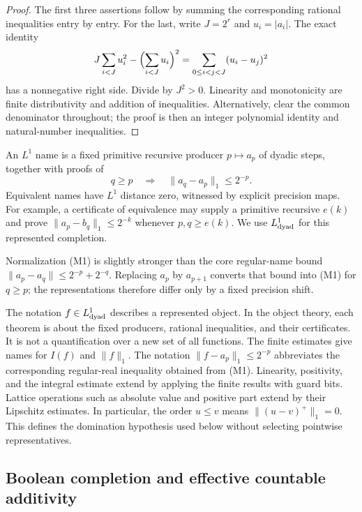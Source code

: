 \begin{proof}
The first three assertions follow by summing the corresponding rational
inequalities entry by entry.  For the last, write \(J=2^r\) and \(u_i=|a_i|\).
The exact identity
\[
 J\sum_{i<J}u_i^2-\Bigl(\sum_{i<J}u_i\Bigr)^2
   =\sum_{0\le i<j<J}(u_i-u_j)^2
\]
has a nonnegative right side.  Divide by \(J^2>0\).
Linearity and monotonicity are finite distributivity and addition of
inequalities.  Alternatively, clear the common denominator throughout; the
proof is then an integer polynomial identity and natural-number inequalities.
\end{proof}

\begin{definition}\label{m:l1}
An \(L^1\) name is a fixed primitive recursive producer \(p\mapsto a_p\) of
dyadic steps, together with proofs of
\[
 q\ge p\quad\Longrightarrow\quad \|a_q-a_p\|_1\le2^{-p}.
 \tag{M1}
\]
Equivalent names have \(L^1\) distance zero, witnessed by explicit precision
maps.  For example, a certificate of equivalence may supply a primitive
recursive \(e(k)\) and prove
\(\|a_p-b_q\|_1\le2^{-k}\) whenever \(p,q\ge e(k)\).
We use \(L^1_{\rm dyad}\) for this represented completion.
\end{definition}

Normalization (M1) is slightly stronger than the core regular-name bound
\(\|a_p-a_q\|\le2^{-p}+2^{-q}\).  Replacing \(a_p\) by \(a_{p+1}\) converts
that bound into (M1) for \(q\ge p\); the representations therefore differ
only by a fixed precision shift.

The notation \(f\in L^1_{\rm dyad}\) describes a represented object.  In the
object theory, each theorem is about the fixed producers, rational
inequalities, and their certificates.  It is not a quantification over a
new set of all functions.  The finite estimates give names for
\(I(f)\) and \(\|f\|_1\).  The notation
\(\|f-a_p\|_1\le2^{-p}\) abbreviates the corresponding regular-real
inequality obtained from (M1).  Linearity, positivity, and the integral
estimate extend by applying the finite results with guard bits.
Lattice operations such as absolute value and positive part extend by
their Lipschitz estimates.  In particular, the order \(u\le v\) means
\(\|(u-v)^+\|_1=0\).  This defines the domination hypothesis used below
without selecting pointwise representatives.

\subsection{Boolean completion and effective countable additivity}

